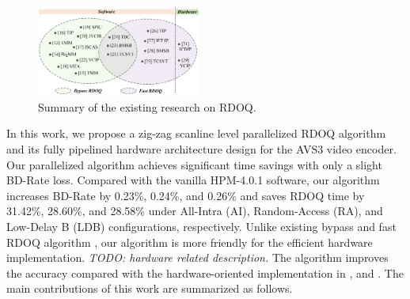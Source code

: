 \documentclass[lettersize,journal]{IEEEtran}
\begin{document}
\begin{figure}[!h]
	\centering
	\centerline{\includegraphics[width=0.48\textwidth]{figure/Summary_rdoq.png}} 
	\caption{Summary of the existing research on RDOQ.}
	\label{summary} %
\end{figure}
\par
In this work, we propose a zig-zag scanline level parallelized RDOQ algorithm and its fully pipelined hardware architecture design for the AVS3 video encoder. Our parallelized algorithm achieves significant time savings with only a slight BD-Rate loss. Compared with the vanilla HPM-4.0.1 software, our algorithm increases BD-Rate by 0.23\%, 0.24\%, and 0.26\% and saves RDOQ time by 31.42\%, 28.60\%, and 28.58\% under All-Intra (AI), Random-Access (RA), and Low-Delay B (LDB) configurations, respectively. Unlike existing bypass and fast RDOQ algorithm \cite{lee2016all-zero, wang2017fastrdoq, fan2016hybridzreoblock, cui2018hybrid, cui2017adaptive, wei2019all, yin2018efficient, yin2020multistageallzerodetection, lee2015fastquantizationmethod, zhang2015fastrdoq, xu2018simplifiedrdoq, xu2020simplifiedLevelEstimation, huang2015efficientquantization, cui2017Laplacedistributionbased, he2015highimplementationrdoq, wang2016improvedrdoq, canh2018rate, kianfar2020parallelized}, our algorithm is more friendly for the efficient hardware implementation. \emph{TODO: hardware related description. } The algorithm improves the accuracy compared with the hardware-oriented implementation in \cite{igarashi2018parallelGPU, xu2022hardwarefriendlyforrdoq}, and \cite{zhao2023scanline}. The main contributions of this work are summarized as follows. 
\end{document}
